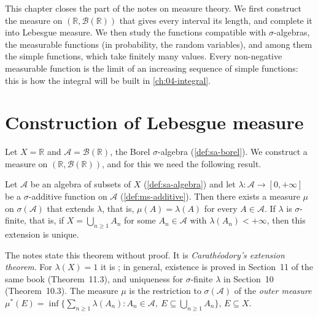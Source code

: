 
This chapter closes the part of the notes on measure theory. We first construct the measure
on $(\mathbb R,\mathcal B(\mathbb R))$ that gives every interval its length, and complete it
into Lebesgue measure. We then study the functions compatible with $\sigma$-algebras, the
measurable functions (in probability, the random variables), and among them the simple
functions, which take finitely many values. Every non-negative measurable function is the
limit of an increasing sequence of simple functions: this is how the integral will be
built in \cref{ch:04-integral}.

\section{Construction of Lebesgue measure}\label{sec:mf-lebesgue}

Let $X=\mathbb R$ and $\mathcal A=\mathcal B(\mathbb R)$, the Borel $\sigma$-algebra
(\cref{def:sa-borel}). We construct a measure on $(\mathbb R,\mathcal B(\mathbb R))$, and for
this we need the following result.

\begin{theorem}\label{thm:mf-extension}
Let $\mathcal A$ be an algebra of subsets of $X$ (\cref{def:sa-algebra}) and let
$\lambda:\mathcal A\to[0,+\infty]$ be a $\sigma$-additive function on $\mathcal A$
(\cref{def:ms-additive}). Then there exists a measure $\mu$ on $\sigma(\mathcal A)$ that
extends $\lambda$, that is, $\mu(A)=\lambda(A)$ for every $A\in\mathcal A$. If $\lambda$ is
$\sigma$-finite, that is, if $X=\bigcup_{n\ge1}A_n$ for some $A_n\in\mathcal A$ with
$\lambda(A_n)<+\infty$, then this extension is unique.
\end{theorem}

The notes state this theorem without proof. It is \emph{Carath\'eodory's extension theorem}.
For $\lambda(X)=1$ it is \citet[Theorem~3.1]{billingsley}; in general, existence is proved in
Section~11 of the same book (Theorem~11.3), and uniqueness for $\sigma$-finite $\lambda$ in
Section~10 (Theorem~10.3). The measure $\mu$ is the
restriction to $\sigma(\mathcal A)$ of the \emph{outer measure}
$\mu^*(E)=\inf\{\sum_{n\ge1}\lambda(A_n):A_n\in\mathcal A,\ E\subseteq\bigcup_{n\ge1}A_n\}$,
$E\subseteq X$.

